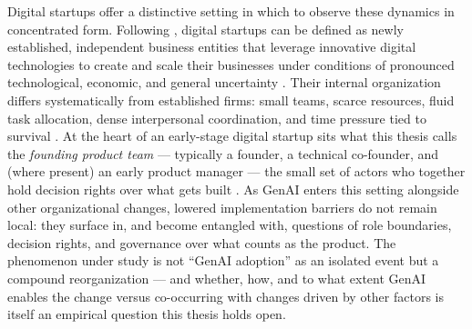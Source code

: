 \documentclass[11pt,a4paper]{article}
\begin{document}
Digital startups offer a distinctive setting in which to observe these dynamics in concentrated form. Following \citet{eggert2024ecs}, digital startups can be defined as newly established, independent business entities that leverage innovative digital technologies to create and scale their businesses under conditions of pronounced technological, economic, and general uncertainty \citep{nambisan2017digital}. Their internal organization differs systematically from established firms: small teams, scarce resources, fluid task allocation, dense interpersonal coordination, and time pressure tied to survival \citep{blank2013lean,ries2011lean}. At the heart of an early-stage digital startup sits what this thesis calls the \emph{founding product team} --- typically a founder, a technical co-founder, and (where present) an early product manager --- the small set of actors who together hold decision rights over what gets built \citep{klotz2014new,beckman2008founding}. As GenAI enters this setting alongside other organizational changes, lowered implementation barriers do not remain local: they surface in, and become entangled with, questions of role boundaries, decision rights, and governance over what counts as the product. The phenomenon under study is not ``GenAI adoption'' as an isolated event but a compound reorganization --- and whether, how, and to what extent GenAI enables the change versus co-occurring with changes driven by other factors is itself an empirical question this thesis holds open.
\end{document}
